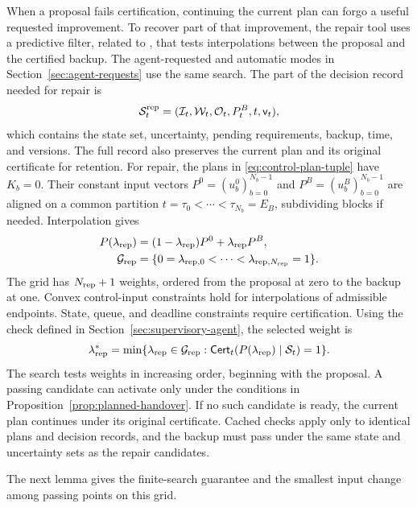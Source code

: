 \documentclass[preprint,12pt]{elsarticle}
\theoremstyle{definition}
\theoremstyle{plain}
\theoremstyle{definition}
\theoremstyle{plain}
\begin{document}
When a proposal fails certification, continuing the current plan can
forgo a useful requested improvement. To recover part of that improvement,
the repair tool uses a predictive filter, related to
\cite{wabersich2021}, that tests interpolations between the proposal and
the certified backup. The agent-requested and automatic modes in
Section~\ref{sec:agent-requests} use the same search. The part of the
decision record needed for repair is
\[
\mathcal S_t^{\rm rep}=(\mathcal I_t,\mathcal W_t,\mathcal O_t,P_t^B,t,\mathsf v_t),
\]
which contains the state set, uncertainty, pending requirements, backup,
time, and versions. The full record also preserves the current plan and
its original certificate for retention. For repair, the plans in
\eqref{eq:control-plan-tuple} have $K_b=0$. Their constant input vectors
$P^0=(u_b^0)_{b=0}^{N_b-1}$ and $P^B=(u_b^B)_{b=0}^{N_b-1}$ are aligned
on a common partition $t=\tau_0<\cdots<\tau_{N_b}=E_B$, subdividing
blocks if needed. Interpolation gives
\begin{equation}
\begin{aligned}
P(\lambda_{\rm rep})&=(1-\lambda_{\rm rep})P^0+\lambda_{\rm rep} P^B,\\
\mathcal G_{\rm rep}&=\{0=\lambda_{{\rm rep},0}<\cdots<\lambda_{{\rm rep},N_{\rm rep}}=1\}.
\end{aligned}
\label{eq:repair-family}
\end{equation}
The grid has $N_{\rm rep}+1$ weights, ordered from the proposal at zero
to the backup at one.
Convex control-input constraints hold for interpolations of admissible endpoints.
State, queue, and deadline constraints require certification.
Using the check defined in Section~\ref{sec:supervisory-agent}, the
selected weight is
\begin{equation}
\lambda_{\rm rep}^*=\min\{\lambda_{\rm rep}\in\mathcal G_{\rm rep}:
                  \mathsf{Cert}_t(P(\lambda_{\rm rep})\mid\mathcal S_t)=1\}.
\label{eq:repair-selection}
\end{equation}
The search tests weights in increasing order, beginning with the proposal.
A passing candidate can activate only under the conditions in
Proposition~\ref{prop:planned-handover}. If no such candidate is ready,
the current plan continues under its original certificate. Cached checks
apply only to identical plans and decision records, and the backup must
pass under the same state and uncertainty sets as the repair candidates.

The next lemma gives the finite-search guarantee and the smallest input
change among passing points on this grid.
\end{document}
